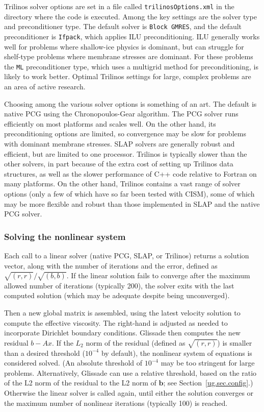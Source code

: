 {Trilinos solver options are set in a file called \texttt{trilinosOptions.xml} in the directory where the code
is executed.
Among the key settings are the solver type and preconditioner type.  The default solver is \texttt{Block GMRES},
and the default preconditioner is \texttt{Ifpack}, which applies ILU preconditioning.  ILU generally works well
for problems where shallow-ice physics is dominant, but can struggle for shelf-type problems where
membrane stresses are dominant.  For these problems the \texttt{ML} preconditioner type, which uses a multigrid
method for preconditioning, is likely to work better.  Optimal Trilinos settings for large, complex
problems are an area of active research.

Choosing among the various solver options is something of an art.  The default is native PCG using
the Chronopoulos-Gear algorithm.  The PCG solver runs efficiently on most platforms and scales well.
On the other hand, its preconditioning options are limited, so convergence may be slow for problems
with dominant membrane stresses.  SLAP solvers are generally robust and efficient, but are limited
to one processor.  Trilinos is typically slower than the other solvers, in part because of the
extra cost of setting up Trilinos data structures, as well as the slower performance of C++ code
relative to Fortran on many platforms.  On the other hand, Trilinos contains a vast range of
solver options (only a few of which have so far been tested with CISM), some of which may 
be more flexible and robust than those implemented in SLAP and the native PCG solver.

\subsubsection{Solving the nonlinear system}

Each call to a linear solver (native PCG, SLAP, or Trilinos) returns a solution vector,
along with the number of iterations and the error, defined as $\sqrt{(r,r)}/\sqrt{(b,b)}$.
If the linear solution fails to converge after the maximum allowed number of iterations
(typically 200), the solver exits with the last computed solution (which may be adequate
despite being unconverged).

Then a new global matrix is assembled, using the latest velocity solution to compute 
the effective viscosity.  The right-hand is adjusted as needed to incorporate Dirichlet
boundary conditions.  Glissade then computes the new residual $b - Ax$.  If the $L_2$ norm of the
residual (defined as $\sqrt{(r,r)}$) is smaller than a desired threshold ($10^{-4}$ by default),
the nonlinear system of equations is considered solved.
(An absolute threshold of $10^{-4}$ may be too stringent for large problems.  Alternatively,
Glissade can use a relative threshold, based on the ratio of the L2 norm of the residual to the L2 norm of
$\mathbf{b}$; see Section~\ref{ug.sec.config}.)
Otherwise the linear solver is called again, until either the solution converges or the 
maximum number of nonlinear iterations (typically 100) is reached.

}
